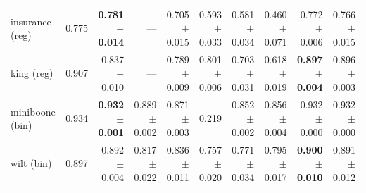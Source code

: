\begin{tabular}{lrrrrrrrrr}
insurance (reg) & 0.775 & \textbf{0.781$\pm$0.014} & --- & 0.705$\pm$0.015 & 0.593$\pm$0.033 & 0.581$\pm$0.034 & 0.460$\pm$0.071 & 0.772$\pm$0.006 & 0.766$\pm$0.015 \\
king (reg) & 0.907 & 0.837$\pm$0.010 & --- & 0.789$\pm$0.009 & 0.801$\pm$0.006 & 0.703$\pm$0.031 & 0.618$\pm$0.019 & \textbf{0.897$\pm$0.004} & 0.896$\pm$0.003 \\
miniboone (bin) & 0.934 & \textbf{0.932$\pm$0.001} & 0.889$\pm$0.002 & 0.871$\pm$0.003 & 0.219 & 0.852$\pm$0.002 & 0.856$\pm$0.004 & 0.932$\pm$0.000 & 0.932$\pm$0.000 \\
wilt (bin) & 0.897 & 0.892$\pm$0.004 & 0.817$\pm$0.022 & 0.836$\pm$0.011 & 0.757$\pm$0.020 & 0.771$\pm$0.034 & 0.795$\pm$0.017 & \textbf{0.900$\pm$0.010} & 0.891$\pm$0.012 \\
\bottomrule
\end{tabular}
\endgroup
